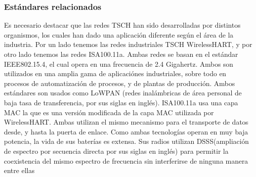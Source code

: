 \subsubsection{Estándares relacionados}

Es necesario destacar que las redes TSCH han sido desarrolladas por distintos organismos, los cuales han dado una aplicación diferente según el área de la industria. Por un lado tenemos las redes industriales TSCH WirelessHART, y por otro lado tenemos las redes ISA100.11a. Ambas redes se basan en el estándar IEEE802.15.4, el cual opera en una frecuencia de 2.4 Gigahertz. Ambos son utilizados en una amplia gama de aplicaciónes industriales, sobre todo en procesos de automatización de procesos, y de plantas de producción.
Ambos estándares son usados como LoWPAN (redes inalámbricas de área personal de baja tasa de transferencia, por sus siglas en inglés). ISA100.11a usa una capa MAC la que es una versión modificada de la capa MAC utilizada por WirelessHART. Ambas utilizan el mismo mecanismo para el transporte de datos desde, y hasta la puerta de enlace. Como ambas tecnologías operan en muy baja potencia, la vida de sus baterías es extensa.
Sus radios utilizan DSSS(ampliación de espectro por secuencia directa por sus siglas en inglés) para permitir la coexistencia del mismo espectro de frecuencia sin interferirse de ninguna manera entre ellas

